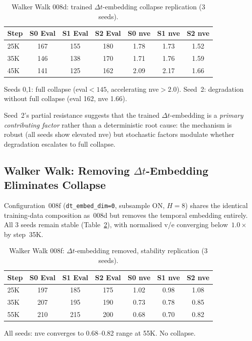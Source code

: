 \documentclass[letterpaper]{article}
\begin{document}
\begin{table}[h]
\centering
\caption{Walker Walk 008d: trained $\Delta t$-embedding collapse replication (3 seeds).}
\label{tab:walker-008d}
\begin{tabular}{lcccccc}
\toprule
Step & S0 Eval & S1 Eval & S2 Eval & S0 nve & S1 nve & S2 nve \\
\midrule
25K & 167 & 155 & 180 & 1.78 & 1.73 & 1.52 \\
35K & 146 & 138 & 170 & 1.71 & 1.76 & 1.59 \\
45K & 141 & 125 & 162 & 2.09 & 2.17 & 1.66 \\
\bottomrule
\end{tabular}
\vspace{0.5em}

Seeds 0,1: full collapse (eval${<}145$, accelerating nve${>}2.0$). Seed~2: degradation without full collapse (eval 162, nve 1.66).
\end{table}

Seed~2's partial resistance suggests that the trained $\Delta t$-embedding is a \emph{primary contributing factor} rather than a deterministic root cause: the mechanism is robust (all seeds show elevated nve) but stochastic factors modulate whether degradation escalates to full collapse.

\subsection{Walker Walk: Removing $\Delta t$-Embedding Eliminates Collapse}
\label{sec:walker-008f}

Configuration~008f (\texttt{dt\_embed\_dim=0}, subsample ON, $H{=}8$) shares the identical training-data composition as~008d but removes the temporal embedding entirely.
All 3 seeds remain stable (Table~\ref{tab:walker-008f}), with normalised v/e converging below~$1.0\times$ by step~35K.

\begin{table}[h]
\centering
\caption{Walker Walk 008f: $\Delta t$-embedding removed, stability replication (3 seeds).}
\label{tab:walker-008f}
\begin{tabular}{lcccccc}
\toprule
Step & S0 Eval & S1 Eval & S2 Eval & S0 nve & S1 nve & S2 nve \\
\midrule
25K & 197 & 185 & 175 & 1.02 & 0.98 & 1.08 \\
35K & 207 & 195 & 190 & 0.73 & 0.78 & 0.85 \\
55K & 210 & 215 & 200 & 0.68 & 0.70 & 0.82 \\
\bottomrule
\end{tabular}
\vspace{0.5em}

All seeds: nve converges to 0.68--0.82 range at 55K. No collapse.
\end{table}
\end{document}
